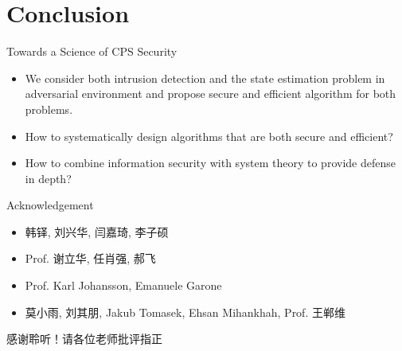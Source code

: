 \documentclass[10pt]{beamer}
\begin{document}
\section{Conclusion}

\begin{frame}{Towards a Science of CPS Security}
  \begin{itemize}
  \item We consider both intrusion detection and the state estimation problem in adversarial environment and propose secure and efficient algorithm for both problems.
  \item How to systematically design algorithms that are both secure and efficient?
  \item How to combine information security with system theory to provide defense in depth?
  \end{itemize}
\end{frame}

\begin{frame}{Acknowledgement}
  \begin{itemize}
    \item 韩铎, 刘兴华, 闫嘉琦, 李子硕
    \item Prof. 谢立华, 任肖强, 郝飞
    \item Prof. Karl Johansson, Emanuele Garone
    \item 莫小雨, 刘其朋, Jakub Tomasek, Ehsan Mihankhah, Prof. 王郸维 
  \end{itemize}
\end{frame}

\begin{frame}[standout]
  感谢聆听！请各位老师批评指正
\end{frame}
\end{document}
